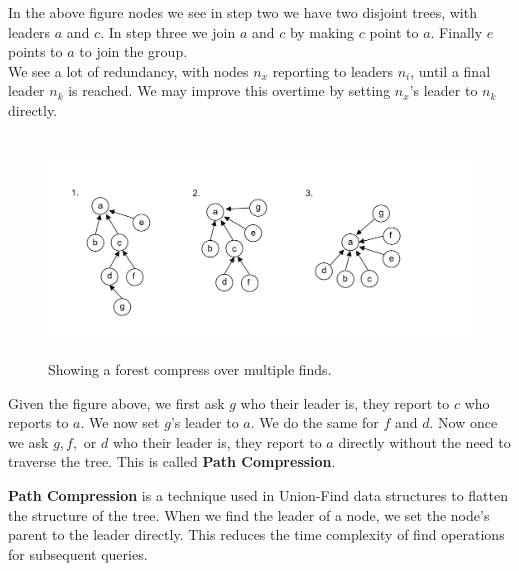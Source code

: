 \noindent
In the above figure nodes we see in step two we have two disjoint trees, with leaders $a$ and $c$. In step three we join $a$ and $c$ by making $c$ point to $a$. Finally $e$ points to $a$ to join the group.\\

\noindent
We see a lot of redundancy, with nodes $n_x$ reporting to leaders $n_i$, until a final leader $n_k$ is reached. We may improve this overtime by setting $n_x$'s leader to $n_k$ directly.\\

\vspace{-3em}
\begin{figure}[h]
    \centering
    \includegraphics[height=2.3in]{./Sections/spanning/path_compression.png}
    
    \vspace{-1em}
    \caption{Showing a forest compress over multiple finds.}
    \label{fig:path_compression}
\end{figure}
\noindent
Given the figure above, we first ask $g$ who their leader is, they report to $c$ who reports to $a$. We now set $g$'s leader to $a$. We do the same for $f$ and $d$. Now once
we ask $g,f,$ or $d$ who their leader is, they report to $a$ directly without the need to traverse the tree. This is called \textbf{Path Compression}.
\begin{Def}

    \textbf{Path Compression} is a technique used in Union-Find data structures to flatten the structure of the tree. 
    When we find the leader of a node, we set the node's parent to the leader directly. This reduces the time complexity of find operations for subsequent queries.
\end{Def}

